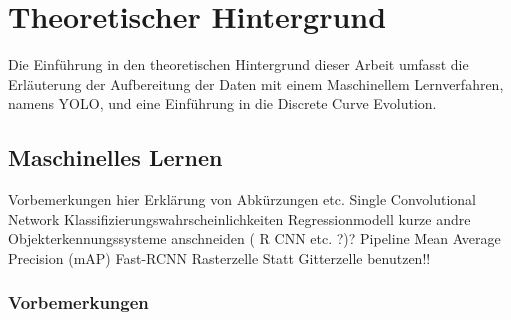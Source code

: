 \chapter{Theoretischer Hintergrund}
\label{ch:Theoretischer Hintergrund}
{Die Einführung in den theoretischen Hintergrund dieser Arbeit umfasst die Erläuterung der Aufbereitung der Daten mit einem Maschinellem Lernverfahren, namens YOLO, und eine Einführung in die \glqq Discrete Curve Evolution\grqq{}.
}



\section{Maschinelles Lernen}
{	Vorbemerkungen hier Erklärung von Abkürzungen etc.
Single Convolutional Network
Klassifizierungswahrscheinlichkeiten
Regressionmodell
kurze andre Objekterkennungssysteme anschneiden ( R CNN etc. ?)?
Pipeline
Mean Average Precision (mAP)
Fast-RCNN
Rasterzelle Statt Gitterzelle benutzen!!
	\subsection{Vorbemerkungen}
}
